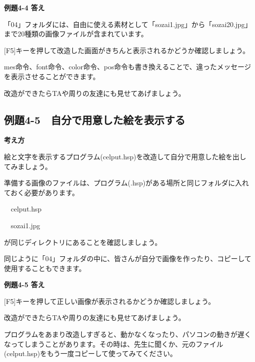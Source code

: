 \documentclass[a4paper,12pt]{jarticle}
\begin{document}
{\bfseries
例題4-4 答え}

\bigskip

「04」フォルダには、自由に使える素材として「sozai1.jpg」から「sozai20.jpg」まで20種類の画像ファイルが含まれています。

[F5]キーを押して改造した画面がきちんと表示されるかどうか確認しましょう。

mes命令、font命令、color命令、pos命令も書き換えることで、違ったメッセージを表示させることができます。

改造ができたらTAや周りの友達にも見せてあげましょう。

\bigskip


\clearpage
\subsection{例題4-5　自分で用意した絵を表示する}
\bigskip
\bigskip

{\bfseries
考え方}

\bigskip

絵と文字を表示するプログラム(celput.hsp)を改造して自分で用意した絵を出してみましょう。

準備する画像のファイルは、プログラム(.hsp)がある場所と同じフォルダに入れておく必要があります。


\bigskip

\ \ celput.hsp

\ \ sozai1.jpg


\bigskip

が同じディレクトリにあることを確認しましょう。

同じように「04」フォルダの中に、皆さんが自分で画像を作ったり、コピーして使用することもできます。


\bigskip


\bigskip


\bigskip


\bigskip

{\bfseries
例題4-5 答え}


\bigskip

[F5]キーを押して正しい画像が表示されるかどうか確認しましょう。

改造ができたらTAや周りの友達にも見せてあげましょう。


\bigskip

プログラムをあまり改造しすぎると、動かなくなったり、パソコンの動きが遅くなってしまうことがあります。その時は、先生に聞くか、元のファイル(celput.hsp)をもう一度コピーして使ってみてください。


\bigskip
\end{document}
